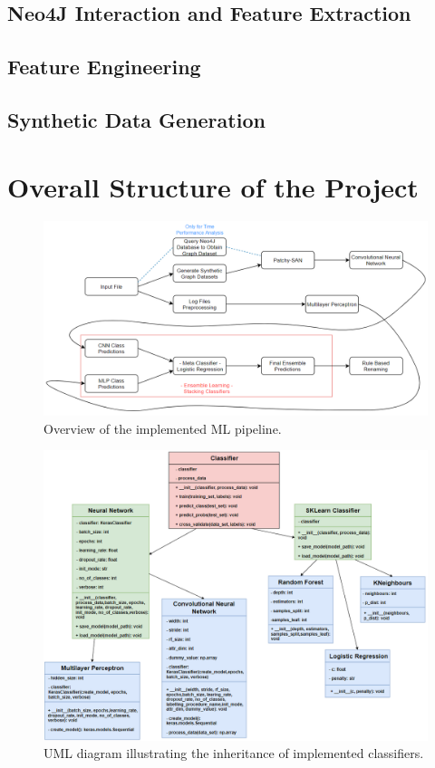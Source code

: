 \subsection{Neo4J Interaction and Feature Extraction}

\subsection{Feature Engineering}

\subsection{Synthetic Data Generation} \label{synthetic data generation}


\section{Overall Structure of the Project}

\begin{figure}[H]
  \centering
  \centerline{\includegraphics[scale = 0.6]{Images/pipeline.png}}
  \caption{Overview of the implemented ML pipeline.}
  \label{pipeline}
\end{figure}

\begin{figure}[H]
  \centering
  \centerline{\includegraphics[scale = 0.7]{Images/uml.png}}
  \caption{UML diagram illustrating the inheritance of implemented classifiers.}
  \label{OOP}
\end{figure}

